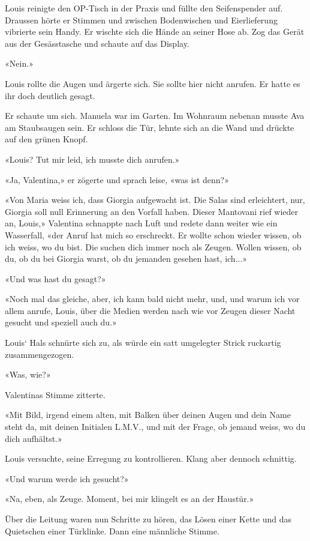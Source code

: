 Louis reinigte den OP-Tisch in der Praxis und füllte den Seifenspender
auf. Draussen hörte er Stimmen und zwischen Bodenwischen und
Eierlieferung vibrierte sein Handy. Er wischte sich die Hände an seiner
Hose ab. Zog das Gerät aus der Gesässtasche und schaute auf das Display.

«Nein.»

Louis rollte die Augen und ärgerte sich. Sie sollte hier nicht anrufen.
Er hatte es ihr doch deutlich gesagt.

Er schaute um sich. Manuela war im Garten. Im Wohnraum nebenan musste
Ava am Staubsaugen sein. Er schloss die Tür, lehnte sich an die Wand und
drückte auf den grünen Knopf.

«Louis? Tut mir leid, ich musste dich anrufen.»

«Ja, Valentina,» er zögerte und sprach leise, «was ist denn?»

«Von Maria weiss ich, dass Giorgia aufgewacht ist. Die Salas sind
erleichtert, nur, Giorgia soll null Erinnerung an den Vorfall haben.
Dieser Mantovani rief wieder an, Louis,» Valentina schnappte nach Luft
und redete dann weiter wie ein Wasserfall, «der Anruf hat mich so
erschreckt. Er wollte schon wieder wissen, ob ich weiss, wo du bist. Die
suchen dich immer noch als Zeugen. Wollen wissen, ob du, ob du bei
Giorgia warst, ob du jemanden gesehen hast, ich...»

«Und was hast du gesagt?»

«Noch mal das gleiche, aber, ich kann bald nicht mehr, und, und warum
ich vor allem anrufe, Louis, über die Medien werden nach wie vor Zeugen
dieser Nacht gesucht und speziell auch du.»

Louis` Hals schnürte sich zu, als würde ein satt umgelegter Strick
ruckartig zusammengezogen.

«Was, wie?»

Valentinas Stimme zitterte.

«Mit Bild, irgend einem alten, mit Balken über deinen Augen und dein
Name steht da, mit deinen Initialen L.M.V., und mit der Frage, ob jemand
weiss, wo du dich aufhältst.»

Louis versuchte, seine Erregung zu kontrollieren. Klang aber dennoch
schnittig.

«Und warum werde ich gesucht?»

«Na, eben, als Zeuge. Moment, bei mir klingelt es an der Haustür.»

Über die Leitung waren nun Schritte zu hören, das Lösen einer Kette und
das Quietschen einer Türklinke. Dann eine männliche Stimme.

